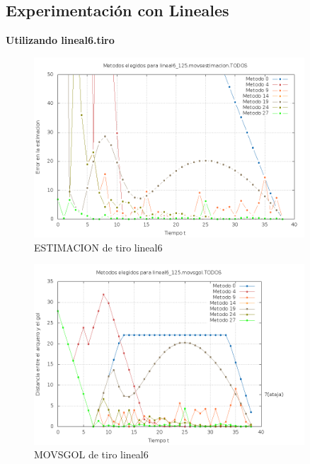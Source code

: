 \subsection{Experimentación con Lineales}

\textbf{Utilizando lineal6.tiro}

\begin{figure}[H]
\begin{center}
\includegraphics[width=0.9\textwidth]{img/lineal6_125_movsestimacion_TODOS_elegidos.png}
     \caption{ESTIMACION de tiro lineal6}
\end{center}
\end{figure}

\begin{figure}[H]
\begin{center}
\includegraphics[width=0.9\textwidth]{img/lineal6_125_movsgol_TODOS_elegidos.png}
     \caption{MOVSGOL de tiro lineal6}
\end{center}
\end{figure}


